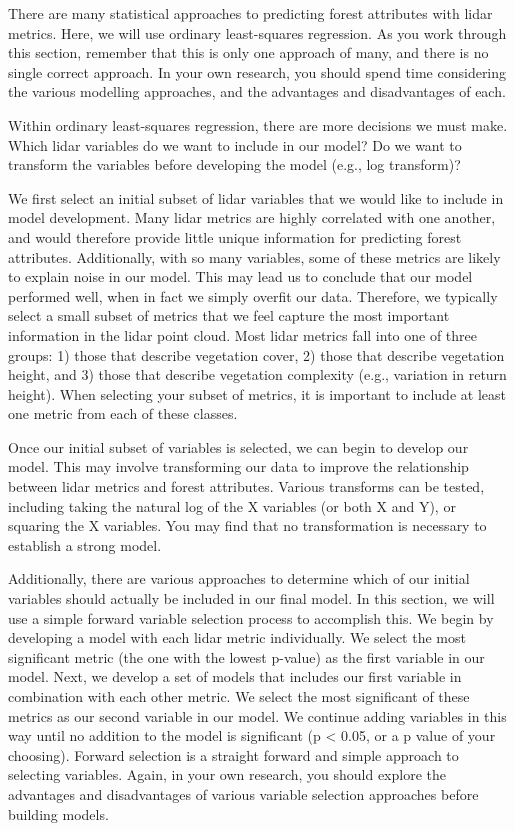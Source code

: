 \documentclass[
]{book}
\begin{document}
There are many statistical approaches to predicting forest attributes with lidar metrics. Here, we will use ordinary least-squares regression. As you work through this section, remember that this is only one approach of many, and there is no single correct approach. In your own research, you should spend time considering the various modelling approaches, and the advantages and disadvantages of each.

Within ordinary least-squares regression, there are more decisions we must make. Which lidar variables do we want to include in our model? Do we want to transform the variables before developing the model (e.g., log transform)?

We first select an initial subset of lidar variables that we would like to include in model development. Many lidar metrics are highly correlated with one another, and would therefore provide little unique information for predicting forest attributes. Additionally, with so many variables, some of these metrics are likely to explain noise in our model. This may lead us to conclude that our model performed well, when in fact we simply overfit our data. Therefore, we typically select a small subset of metrics that we feel capture the most important information in the lidar point cloud. Most lidar metrics fall into one of three groups: 1) those that describe vegetation cover, 2) those that describe vegetation height, and 3) those that describe vegetation complexity (e.g., variation in return height). When selecting your subset of metrics, it is important to include at least one metric from each of these classes.

Once our initial subset of variables is selected, we can begin to develop our model. This may involve transforming our data to improve the relationship between lidar metrics and forest attributes. Various transforms can be tested, including taking the natural log of the X variables (or both X and Y), or squaring the X variables. You may find that no transformation is necessary to establish a strong model.

Additionally, there are various approaches to determine which of our initial variables should actually be included in our final model. In this section, we will use a simple forward variable selection process to accomplish this. We begin by developing a model with each lidar metric individually. We select the most significant metric (the one with the lowest p-value) as the first variable in our model. Next, we develop a set of models that includes our first variable in combination with each other metric. We select the most significant of these metrics as our second variable in our model. We continue adding variables in this way until no addition to the model is significant (p \textless{} 0.05, or a p value of your choosing). Forward selection is a straight forward and simple approach to selecting variables. Again, in your own research, you should explore the advantages and disadvantages of various variable selection approaches before building models.
\end{document}
